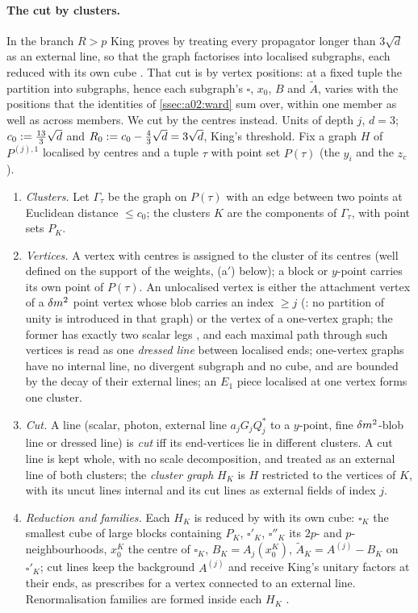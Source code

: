 \paragraph{The cut by clusters.} In the branch $R>p$ King proves \cite[(3.38)]{K1} by treating every propagator longer than $3\sqrt d$ as an external line, so that the graph factorises into localised subgraphs, each reduced with its own cube \cite[p.~666]{K1}. That cut is by vertex positions: at a fixed tuple the partition into subgraphs, hence each subgraph's $\square$, $x_0$, $B$ and $\tilde A$, varies with the positions that the identities of \cref{ssec:a02:ward} sum over, within one member as well as across members. We cut by the centres instead. Units of depth $j$, $d=3$; $c_0:=\frac{13}3\sqrt d$ and $R_0:= c_0-\frac43\sqrt d=3\sqrt d$, King's threshold. Fix a graph $H$ of $P^{(j),1}$ localised by centres and a tuple $\tau$ with point set $P(\tau)$ (the $y_i$ and the $z_c$).
\begin{enumerate}[label=\textup{(C\arabic*)},nosep,leftmargin=*]
\item \emph{Clusters.} Let $\Gamma_\tau$ be the graph on $P(\tau)$ with an edge between two points at Euclidean distance $\le c_0$; the clusters $K$ are the components of $\Gamma_\tau$, with point sets $P_K$.
\item \emph{Vertices.} A vertex with centres is assigned to the cluster of its centres (well defined on the support of the weights, (a$'$) below); a block or $y$-point carries its own point of $P(\tau)$. An unlocalised vertex is either the attachment vertex of a $\delta m^2$ point vertex whose blob carries an index $\ge j$ (\cite[p.~667]{K1}: no partition of unity is introduced in that graph) or the vertex of a one-vertex graph; the former has exactly two scalar legs \cite[(3.19)]{K1}, and each maximal path through such vertices is read as one \emph{dressed line} between localised ends; one-vertex graphs have no internal line, no divergent subgraph and no cube, and are bounded by the decay of their external lines; an $E_1$ piece localised at one vertex forms one cluster.
\item \emph{Cut.} A line (scalar, photon, external line $a_jG_jQ_j^*$ to a $y$-point, fine $\delta m^2$-blob line or dressed line) is \emph{cut} iff its end-vertices lie in different clusters. A cut line is kept whole, with no scale decomposition, and treated as an external line of both clusters; the \emph{cluster graph} $H_K$ is $H$ restricted to the vertices of $K$, with its uncut lines internal and its cut lines as external fields of index $j$.
\item \emph{Reduction and families.} Each $H_K$ is reduced by \cite[(3.43)--(3.55)]{K1} with its own cube: $\square_K$ the smallest cube of large blocks containing $P_K$, $\square'_K$, $\square''_K$ its $2p$- and $p$-neighbourhoods, $x_0^K$ the centre of $\square_K$, $B_K=A_j(x_0^K)$, $\tilde A_K=A^{(j)}-B_K$ on $\square'_K$; cut lines keep the background $A^{(j)}$ and receive King's unitary factors \cite[(3.46)]{K1} at their ends, as \cite[p.~661]{K1} prescribes for a vertex connected to an external line. Renormalisation families are formed inside each $H_K$ \cite[p.~666]{K1}.
\end{enumerate}
